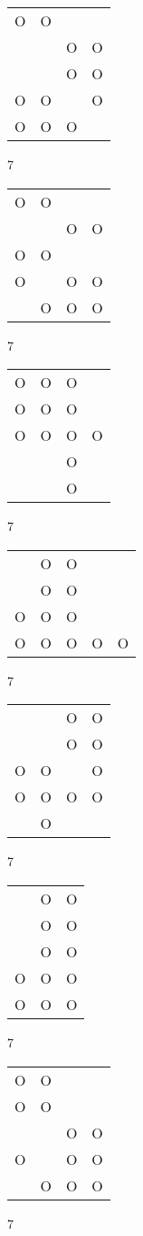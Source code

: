 \begin{tabular}{|m{0.2cm}m{0.2cm}m{0.2cm}m{0.2cm}|}\hline
O&O& & \\
 & &O&O\\
 & &O&O\\
O&O& &O\\
O&O&O& \\
\hline\end{tabular}7
\begin{tabular}{|m{0.2cm}m{0.2cm}m{0.2cm}m{0.2cm}|}\hline
O&O& & \\
 & &O&O\\
O&O& & \\
O& &O&O\\
 &O&O&O\\
\hline\end{tabular}7
\begin{tabular}{|m{0.2cm}m{0.2cm}m{0.2cm}m{0.2cm}|}\hline
O&O&O& \\
O&O&O& \\
O&O&O&O\\
 & &O& \\
 & &O& \\
\hline\end{tabular}7
\begin{tabular}{|m{0.2cm}m{0.2cm}m{0.2cm}m{0.2cm}m{0.2cm}|}\hline
 &O&O& & \\
 &O&O& & \\
O&O&O& & \\
O&O&O&O&O\\
\hline\end{tabular}7
\begin{tabular}{|m{0.2cm}m{0.2cm}m{0.2cm}m{0.2cm}|}\hline
 & &O&O\\
 & &O&O\\
O&O& &O\\
O&O&O&O\\
 &O& & \\
\hline\end{tabular}7
\begin{tabular}{|m{0.2cm}m{0.2cm}m{0.2cm}|}\hline
 &O&O\\
 &O&O\\
 &O&O\\
O&O&O\\
O&O&O\\
\hline\end{tabular}7
\begin{tabular}{|m{0.2cm}m{0.2cm}m{0.2cm}m{0.2cm}|}\hline
O&O& & \\
O&O& & \\
 & &O&O\\
O& &O&O\\
 &O&O&O\\
\hline\end{tabular}7
